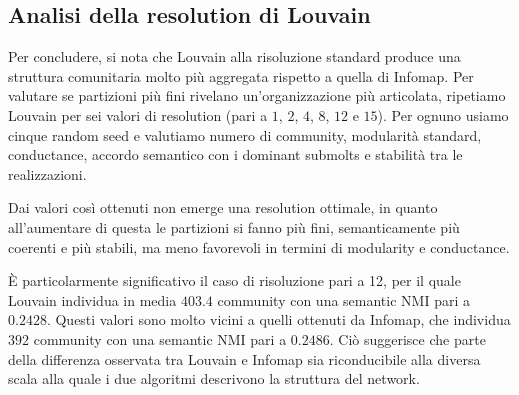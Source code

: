 \documentclass[twocolumn]{article}
\begin{document}
   \subsection{Analisi della resolution di Louvain}

   Per concludere, si nota che Louvain alla risoluzione standard produce una struttura comunitaria molto più aggregata rispetto a quella di Infomap. Per valutare se partizioni più fini rivelano un'organizzazione più articolata, ripetiamo Louvain per sei valori di resolution (pari a $1$, $2$, $4$, $8$, $12$ e $15$). 
   Per ognuno usiamo cinque random seed e valutiamo numero di community, modularità standard, conductance, accordo semantico con i dominant submolts e stabilità tra le realizzazioni.

   \begin{table}[htb]
      \centering
      \caption{Risultati medi dell'analisi di sensitivity alla resolution di Louvain.}
      \label{tab:louvain_resolution}
   \end{table}

   Dai valori così ottenuti non emerge una resolution ottimale, in quanto all'aumentare di questa le partizioni si fanno più fini, semanticamente più coerenti e più stabili, ma meno favorevoli in termini di modularity e conductance.

   È particolarmente significativo il caso di risoluzione pari a 12, per il quale Louvain individua in media $403.4$ community con una semantic NMI pari a $0.2428$. 
   Questi valori sono molto vicini a quelli ottenuti da Infomap, che individua $392$ community con una semantic NMI pari a $0.2486$. 
   Ciò suggerisce che parte della differenza osservata tra Louvain e Infomap sia riconducibile alla diversa scala alla quale i due algoritmi descrivono la struttura del network.
\end{document}
